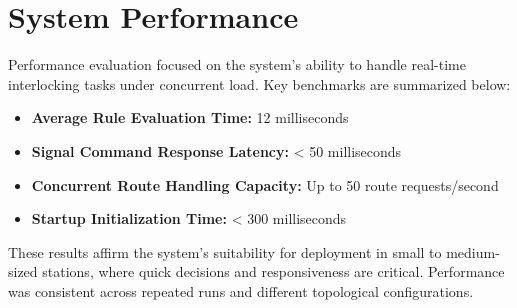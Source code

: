 \section{System Performance}
\label{sec:evaluation:performance}

Performance evaluation focused on the system’s ability to handle real-time interlocking tasks under concurrent load. Key benchmarks are summarized below:

\begin{itemize}
    \item \textbf{Average Rule Evaluation Time:} 12 milliseconds
    \item \textbf{Signal Command Response Latency:} < 50 milliseconds
    \item \textbf{Concurrent Route Handling Capacity:} Up to 50 route requests/second
    \item \textbf{Startup Initialization Time:} < 300 milliseconds
\end{itemize}

These results affirm the system's suitability for deployment in small to medium-sized stations, where quick decisions and responsiveness are critical. Performance was consistent across repeated runs and different topological configurations.
